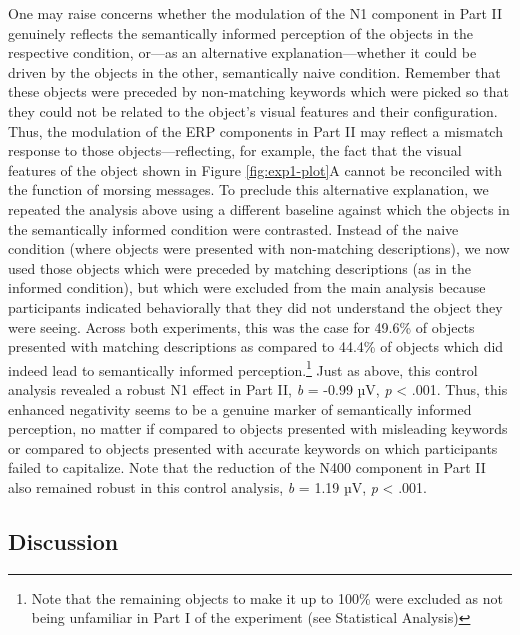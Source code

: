 \documentclass[
  english,
  man,11pt,floatsintext]{apa7}
\begin{document}
One may raise concerns whether the modulation of the N1 component in Part II genuinely reflects the semantically informed perception of the objects in the respective condition, or---as an alternative explanation---whether it could be driven by the objects in the other, semantically naive condition. Remember that these objects were preceded by non-matching keywords which were picked so that they could not be related to the object's visual features and their configuration. Thus, the modulation of the ERP components in Part II may reflect a mismatch response to those objects---reflecting, for example, the fact that the visual features of the object shown in Figure \ref{fig:exp1-plot}A cannot be reconciled with the function of morsing messages. To preclude this alternative explanation, we repeated the analysis above using a different baseline against which the objects in the semantically informed condition were contrasted. Instead of the naive condition (where objects were presented with non-matching descriptions), we now used those objects which were preceded by matching descriptions (as in the informed condition), but which were excluded from the main analysis because participants indicated behaviorally that they did not understand the object they were seeing. Across both experiments, this was the case for 49.6\% of objects presented with matching descriptions as compared to 44.4\% of objects which did indeed lead to semantically informed perception.\footnote{Note that the remaining objects to make it up to 100\% were excluded as not being unfamiliar in Part I of the experiment (see Statistical Analysis)} Just as above, this control analysis revealed a robust N1 effect in Part II, \emph{b} = -0.99 µV, \emph{p} \textless{} .001. Thus, this enhanced negativity seems to be a genuine marker of semantically informed perception, no matter if compared to objects presented with misleading keywords or compared to objects presented with accurate keywords on which participants failed to capitalize. Note that the reduction of the N400 component in Part II also remained robust in this control analysis, \emph{b} = 1.19 µV, \emph{p} \textless{} .001.

\hypertarget{discussion-1}{%
\subsection{Discussion}\label{discussion-1}}
\end{document}

